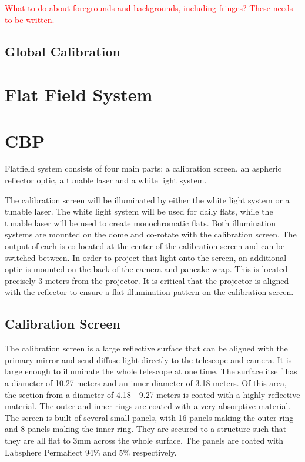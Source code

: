 \documentclass[SE,authoryear,lsstdraft,toc]{lsstdoc}
\newcommand{\todo}[1]{\textcolor{red}{#1}}
\begin{document}
\todo{What to do about foregrounds and backgrounds, including fringes?  These needs to be written.}

\subsection{Global Calibration}

\section{Flat Field System}


\section{CBP}

Flatfield system consists of four main parts: a calibration screen, an aspheric reflector optic, a tunable laser and a white light system.

The calibration screen will be illuminated by either the white light system or
a tunable laser. The white light system will be used for daily flats, while the
tunable laser will be used to create monochromatic flats. Both illumination
systems are mounted on the dome and co-rotate with the calibration screen. The
output of each is co-located at the center of the calibration screen and can be
switched between. In order to project that light onto the screen, an additional
optic is mounted on the back of the camera and pancake wrap. This is located
precisely 3 meters from the projector. It is critical that the projector is
aligned with the reflector to ensure a flat illumination pattern on the
calibration screen.

\subsection{Calibration Screen}
The calibration screen is a large reflective surface that can be aligned with the primary mirror and send diffuse light directly to the telescope and camera. It is large enough to illuminate the whole telescope at one time. The surface itself has a diameter of 10.27 meters and an inner diameter of 3.18 meters. Of this area, the section from a diameter of 4.18 - 9.27 meters is coated with a highly reflective material. The outer and inner rings are coated with a very absorptive material. The screen is built of several small panels, with 16 panels making the outer ring and 8 panels making the inner ring. They are secured to a structure such that they are all flat to 3mm across the whole surface. The panels are coated with Labsphere Permaflect 94\% and 5\% respectively.
\end{document}
